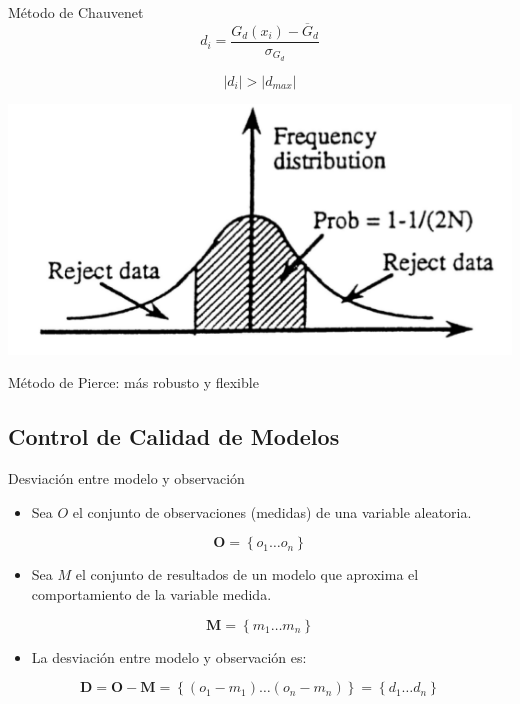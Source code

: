 \documentclass[xcolor={usenames,svgnames,dvipsnames}]{beamer}
\begin{document}
\begin{frame}[label=sec-7-3-11]{Método de Chauvenet}
\[
d_i = \frac{G_d(x_i) - \overline{G}_d}{\sigma_{G_d}}
\]

\[
\left| d_i \right| > \left| d_{max} \right|
\]

\begin{center}
\includegraphics[width=.9\linewidth]{../figs/chauvenet.png}
\end{center}

\begin{block}{Método de Pierce: más robusto y flexible \nocite{Ross2003}}
\end{block}
\end{frame}

\subsection{Control de Calidad de Modelos}
\label{sec-7-4}

\begin{frame}[label=sec-7-4-1]{Desviación entre modelo y observación}
\begin{itemize}
\item Sea $O$ el conjunto de observaciones (medidas) de una variable aleatoria.
\end{itemize}

\[
\mathbf{O} = \left\{ o_1 \dots o_n \right\}
\]
\begin{itemize}
\item Sea $M$ el conjunto de resultados de un modelo que aproxima el comportamiento de la variable medida.
\end{itemize}

\[
\mathbf{M} = \left\{ m_1 \dots m_n  \right\}
\]

\begin{itemize}
\item La desviación entre modelo y observación es:
\end{itemize}

\[
\mathbf{D} = \mathbf{O} - \mathbf{M} =  \left\{ (o_1 - m_1) \dots (o_n - m_n)  \right\} = \left\{ d_1 \dots d_n  \right\}
\]
\end{frame}
\end{document}
